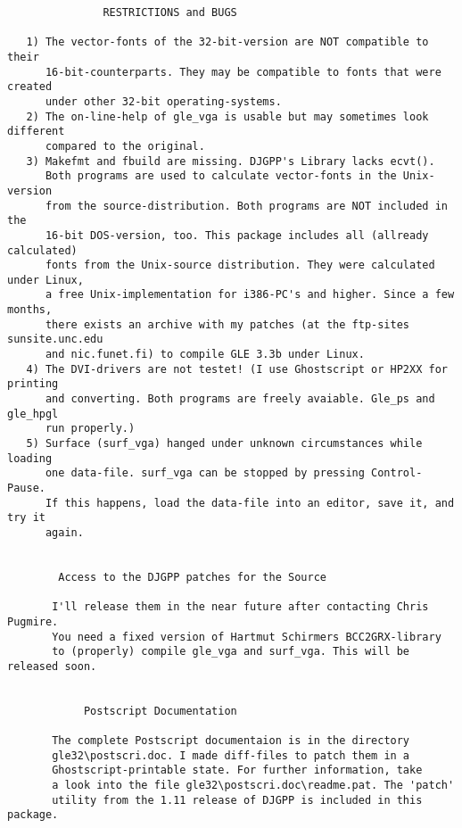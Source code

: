 \begin{center}
\begin{minipage}[t]{11.0cm}
{\scriptsize
\begin{verbatim}
		       RESTRICTIONS and BUGS
		
   1) The vector-fonts of the 32-bit-version are NOT compatible to their
      16-bit-counterparts. They may be compatible to fonts that were created
      under other 32-bit operating-systems.
   2) The on-line-help of gle_vga is usable but may sometimes look different
      compared to the original.
   3) Makefmt and fbuild are missing. DJGPP's Library lacks ecvt().
      Both programs are used to calculate vector-fonts in the Unix-version
      from the source-distribution. Both programs are NOT included in the
      16-bit DOS-version, too. This package includes all (allready calculated)
      fonts from the Unix-source distribution. They were calculated under Linux,
      a free Unix-implementation for i386-PC's and higher. Since a few months,
      there exists an archive with my patches (at the ftp-sites sunsite.unc.edu
      and nic.funet.fi) to compile GLE 3.3b under Linux. 
   4) The DVI-drivers are not testet! (I use Ghostscript or HP2XX for printing
      and converting. Both programs are freely avaiable. Gle_ps and gle_hpgl
      run properly.)
   5) Surface (surf_vga) hanged under unknown circumstances while loading
      one data-file. surf_vga can be stopped by pressing Control-Pause.
      If this happens, load the data-file into an editor, save it, and try it
      again.


		Access to the DJGPP patches for the Source

       I'll release them in the near future after contacting Chris Pugmire.
       You need a fixed version of Hartmut Schirmers BCC2GRX-library
       to (properly) compile gle_vga and surf_vga. This will be released soon. 


			Postscript Documentation
			
       The complete Postscript documentaion is in the directory
       gle32\postscri.doc. I made diff-files to patch them in a
       Ghostscript-printable state. For further information, take
       a look into the file gle32\postscri.doc\readme.pat. The 'patch'
       utility from the 1.11 release of DJGPP is included in this package.


\end{verbatim}
}
\end{minipage}
\end{center}
